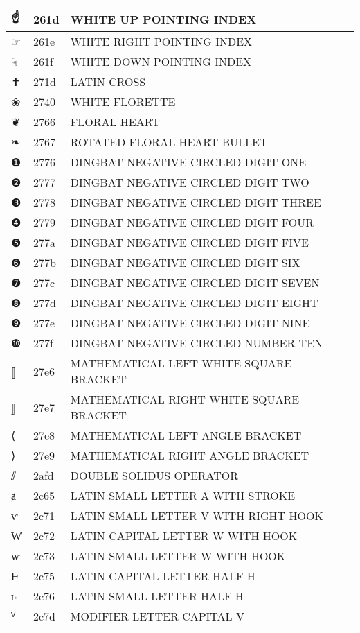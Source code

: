 \documentclass[12pt,letterpaper,openany]{book}
\begin{document}
\begin{center}
\begin{supertabular}{|m{0.25in}|m{0.5in}|m{4in}|}
			☝ & 261d & WHITE UP POINTING INDEX\\\hline
			☞ & 261e & WHITE RIGHT POINTING INDEX\\\hline
			☟ & 261f & WHITE DOWN POINTING INDEX\\\hline
			✝ & 271d & LATIN CROSS\\\hline
			❀ & 2740 & WHITE FLORETTE\\\hline
			❦ & 2766 & FLORAL HEART\\\hline
			❧ & 2767 & ROTATED FLORAL HEART BULLET\\\hline
			❶ & 2776 & DINGBAT NEGATIVE CIRCLED DIGIT ONE\\\hline
			❷ & 2777 & DINGBAT NEGATIVE CIRCLED DIGIT TWO\\\hline
			❸ & 2778 & DINGBAT NEGATIVE CIRCLED DIGIT THREE\\\hline
			❹ & 2779 & DINGBAT NEGATIVE CIRCLED DIGIT FOUR\\\hline
			❺ & 277a & DINGBAT NEGATIVE CIRCLED DIGIT FIVE\\\hline
			❻ & 277b & DINGBAT NEGATIVE CIRCLED DIGIT SIX\\\hline
			❼ & 277c & DINGBAT NEGATIVE CIRCLED DIGIT SEVEN\\\hline
			❽ & 277d & DINGBAT NEGATIVE CIRCLED DIGIT EIGHT\\\hline
			❾ & 277e & DINGBAT NEGATIVE CIRCLED DIGIT NINE\\\hline
			❿ & 277f & DINGBAT NEGATIVE CIRCLED NUMBER TEN\\\hline
			⟦ & 27e6 & MATHEMATICAL LEFT WHITE SQUARE BRACKET\\\hline
			⟧ & 27e7 & MATHEMATICAL RIGHT WHITE SQUARE BRACKET\\\hline
			⟨ & 27e8 & MATHEMATICAL LEFT ANGLE BRACKET\\\hline
			⟩ & 27e9 & MATHEMATICAL RIGHT ANGLE BRACKET\\\hline
			⫽ & 2afd & DOUBLE SOLIDUS OPERATOR\\\hline
			ⱥ & 2c65 & LATIN SMALL LETTER A WITH STROKE\\\hline
			ⱱ & 2c71 & LATIN SMALL LETTER V WITH RIGHT HOOK\\\hline
			Ⱳ & 2c72 & LATIN CAPITAL LETTER W WITH HOOK\\\hline
			ⱳ & 2c73 & LATIN SMALL LETTER W WITH HOOK\\\hline
			Ⱶ & 2c75 & LATIN CAPITAL LETTER HALF H\\\hline
			ⱶ & 2c76 & LATIN SMALL LETTER HALF H\\\hline
			ⱽ & 2c7d & MODIFIER LETTER CAPITAL V\\\hline

\end{supertabular}
\end{center}
\end{document}

